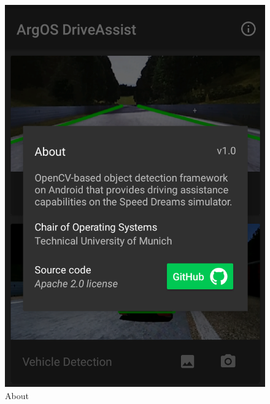 \begin{figure}[H]
	\includegraphics[width=\linewidth]{images/screenshot_about.png}
	\caption{About}\label{fig:about}
	\endminipage

\end{figure}


